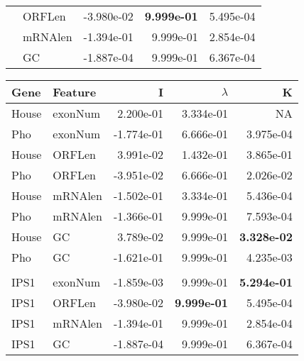 \documentclass[varwidth,convert]{standalone}
\begin{document}
\begin{tabular}{llrrr}
 & ORFLen & -3.980e-02  & \textbf{9.999e-01} &  5.495e-04  \\ 
 & mRNAlen & -1.394e-01  & 9.999e-01  & 2.854e-04 \\ 
 & GC & -1.887e-04 & 9.999e-01  & 6.367e-04  \\ 
\bottomrule
\end{tabular}

\bigbreak

\begin{tabular}{llrrr}
\toprule
Gene & Feature & I & $\lambda$  & K  \\ 
\midrule
House & exonNum & 2.200e-01  & 3.334e-01 &         NA  \\ 
Pho & exonNum & -1.774e-01 &  6.666e-01 &  3.975e-04  \\ 
House & ORFLen & 3.991e-02 & 1.432e-01 & 3.865e-01  \\ 
Pho & ORFLen & -3.951e-02  &  6.666e-01  &  2.026e-02  \\ 
House & mRNAlen & -1.502e-01  &  3.334e-01 &  5.436e-04  \\ 
Pho & mRNAlen & -1.366e-01  &  9.999e-01  &  7.593e-04  \\ 
House & GC & 3.789e-02  & 9.999e-01 & \textbf{3.328e-02} \\ 
Pho & GC & -1.621e-01  &  9.999e-01  &  4.235e-03  \\ 
\\
IPS1 & exonNum & -1.859e-03  & 9.999e-01 & \textbf{5.294e-01}  \\ 
IPS1 & ORFLen & -3.980e-02  & \textbf{9.999e-01} &  5.495e-04  \\ 
IPS1 & mRNAlen & -1.394e-01  & 9.999e-01  & 2.854e-04 \\ 
IPS1 & GC & -1.887e-04 & 9.999e-01  & 6.367e-04  \\ 
\bottomrule

\end{tabular}

\bigbreak
\end{document}
